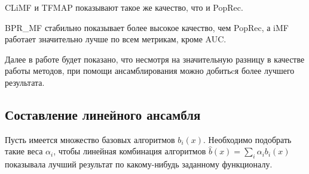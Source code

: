 \documentclass[14pt]{extarticle}
\begin{document}
\begin{table}[H]
\caption{Набор данных Movie Lens 1m}
\label{tab:2comp4}
\end{table}

CLiMF и TFMAP показывают такое же качество, что и PopRec. 

BPR\_MF стабильно показывает более высокое качество, чем PopRec, а iMF  работает значительно лучше по всем метрикам, кроме AUC. 

Далее в работе будет показано, что несмотря на значительную разницу в качестве работы методов, при помощи ансамблирования можно добитьcя более лучшего результата.


\subsection{Составление линейного  ансамбля}


Пусть имеется множество базовых алгоритмов $b_i(x)$. Необходимо подобрать такие веса $\alpha_i$, чтобы линейная комбинация алгоритмов $\hat{b}(x) = \sum_i \alpha_i b_i(x)$ показывала лучший результат по какому-нибудь заданному функционалу. 
\end{document}
